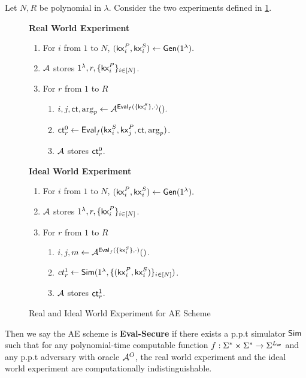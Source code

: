 \begin{definition}
\label{defn:AE-eval-security}
Let $N, R$ be polynomial in $\lambda$. Consider the two experiments defined in \cref{expr:AE-real-ideal-world}.

\begin{figure}[h!]
\begin{framed}
\textbf{Real World Experiment}
\begin{enumerate}
    \item For $i$ from $1$ to $N$, $(\mathsf{kx}_i^P, \mathsf{kx}_i^S) \leftarrow \mathsf{Gen}(1^{\lambda}).$
    \item $\mathcal{A}$ stores $1^{\lambda}, r, \{\mathsf{kx}_i^P\}_{i \in [N]}$.
    \item For $r$ from $1$ to $R$
    \begin{enumerate}
        \item $i, j, \mathsf{ct}, \arg_p \leftarrow \mathcal{A}^{\mathsf{Eval}_f(\{\mathsf{kx}_i^S\}, \cdot)}().$
        \item $\mathsf{ct}^{0}_r \leftarrow \mathsf{Eval}_f(\mathsf{kx}_i^S, \mathsf{kx}_j^P, \mathsf{ct}, \arg_p)$.
        \item $\mathcal{A}$ stores $\mathsf{ct}^{0}_r$.
    \end{enumerate}
\end{enumerate}
\textbf{Ideal World Experiment}
\begin{enumerate}
    \item For $i$ from $1$ to $N$, $(\mathsf{kx}_i^P, \mathsf{kx}_i^S) \leftarrow \mathsf{Gen}(1^{\lambda}).$
    \item $\mathcal{A}$ stores $1^{\lambda}, r, \{\mathsf{kx}_i^P\}_{i \in [N]}$.
    \item For $r$ from $1$ to $R$
    \begin{enumerate}
        \item $i, j, m \leftarrow \mathcal{A}^{\mathsf{Eval}_f(\{\mathsf{kx}_i^S\}, \cdot)}()$.
        \item $ct^1_r \leftarrow \mathsf{Sim}(1^{\lambda}, \{(\mathsf{kx}_i^P, \mathsf{kx}_i^S)\}_{i \in [N]})$.
        \item $\mathcal{A}$ stores $\mathsf{ct}^{1}_r$.
    \end{enumerate}
\end{enumerate}
\end{framed}
\caption{Real and Ideal World Experiment for AE Scheme}
\label{expr:AE-real-ideal-world}
\end{figure}

Then we say the AE scheme is \textbf{Eval-Secure} if there exists a p.p.t simulator $\mathsf{Sim}$ such that for any polynomial-time computable function $f: \Sigma^* \times \Sigma^* \to \Sigma^{L_{\mathsf{ae}}}$ and any p.p.t adversary with oracle $\mathcal{A}^O$, the real world experiment and the ideal world experiment are computationally indistinguishable.
\end{definition}

